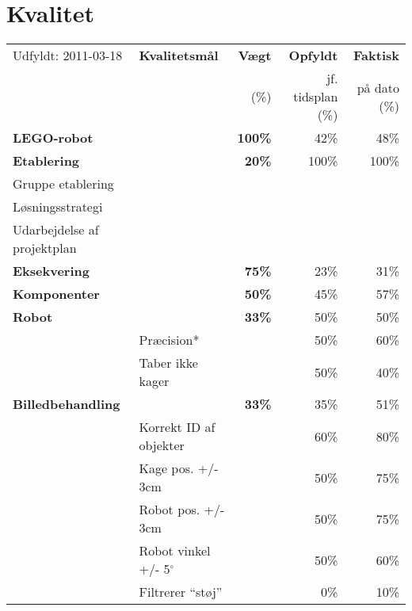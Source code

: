 \section{Kvalitet}
\begin{footnotesize}
\begin{center}
\begin{tabular}{l | l | r r r}
	\footnotesize{Udfyldt: 2011-03-18}	& \textbf{Kvalitetsmål} & \textbf{Vægt} & \textbf{Opfyldt} & \textbf{Faktisk}\\
	& & \footnotesize{(\%)}	& \footnotesize{jf. tidsplan (\%)}	& \footnotesize{på dato (\%)} \\
	\hline
	\textbf{LEGO-robot}
																&		& \textbf{100\%} & 42\% & 48\% \\
	\hline
	\hline
	\textbf{Etablering}
																&		& \textbf{20\%} 	& 	100\%	& 100\% \\
	\hspace*{0.3cm} Gruppe etablering
					 											&		&		&		& \\
	\hspace*{0.3cm} Løsningsstrategi
					 											&		&		&		& \\
	\hspace*{0.3cm} Udarbejdelse af projektplan 
																&		&		&		& \\
	\hline
	\textbf{Eksekvering}
																&		& \textbf{75\%}	& 23\% & 31\% \\		
	\hspace*{0.3cm}\textbf{Komponenter}
																&		& \textbf{50\%}		& 	45\% & 57\%\\
	\hspace*{0.3cm}\hspace*{0.3cm} \textbf{Robot}
																& 		& \textbf{33\%} 	& 	50\% & 50\% \\
	& Præcision* & & 50\% & 60\% \\
	& Taber ikke kager & & 50\% & 40\% \\
	\hspace*{0.3cm}\hspace*{0.3cm} \textbf{Billedbehandling}
																& & \textbf{33\%}		&	35\% & 	51\% \\
	& Korrekt ID af objekter & & 60\% & 80\% \\
	& Kage pos. +/- 3cm & & 50\% & 75\% \\
	& Robot pos. +/- 3cm & & 50\% & 75\% \\
	& Robot vinkel +/- 5$^\circ$ & & 50\% & 60\% \\
	& Filtrerer "`støj"' & & 0\% & 10\% \\

\end{tabular}
\end{center}
\end{footnotesize}
